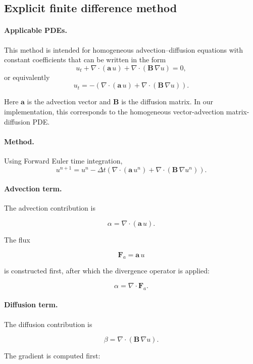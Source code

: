 \documentclass[11pt,a4paper,parskip=half-]{scrartcl}
\theoremstyle{definition}
\theoremstyle{plain}
\theoremstyle{remark}
\begin{document}
\subsection{Explicit finite difference method}

\paragraph{Applicable PDEs.}

This method is intended for homogeneous advection--diffusion equations
with constant coefficients that can be written in the form
\[
u_t
+
\nabla\cdot(\mathbf a\,u)
+
\nabla\cdot(\mathbf B\,\nabla u)
=
0,
\]
or equivalently
\[
u_t
=
-
\left(
\nabla\cdot(\mathbf a\,u)
+
\nabla\cdot(\mathbf B\,\nabla u)
\right).
\]

Here $\mathbf a$ is the advection vector and $\mathbf B$ is the diffusion
matrix. In our implementation, this corresponds to the homogeneous
vector-advection matrix-diffusion PDE.

\paragraph{Method.}

Using Forward Euler time integration,
\[
u^{n+1}
=
u^n
-
\Delta t
\left(
\nabla\cdot(\mathbf a\,u^n)
+
\nabla\cdot(\mathbf B\,\nabla u^n)
\right).
\]

\paragraph{Advection term.}

The advection contribution is

\[
\alpha
=
\nabla\cdot(\mathbf a\,u).
\]

The flux

\[
\mathbf F_a
=
\mathbf a\,u
\]

is constructed first, after which the divergence operator
is applied:

\[
\alpha
=
\nabla\cdot \mathbf F_a.
\]

\paragraph{Diffusion term.}

The diffusion contribution is

\[
\beta
=
\nabla\cdot(\mathbf B\,\nabla u).
\]

The gradient is computed first:
\end{document}
